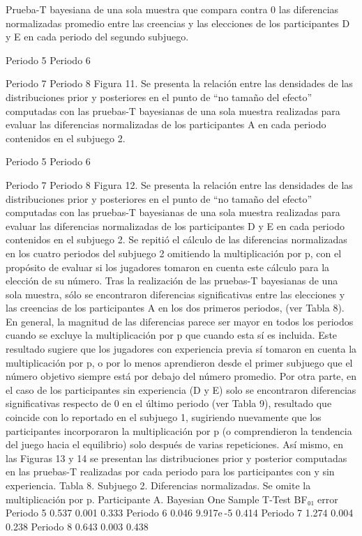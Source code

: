 Prueba-T bayesiana de una sola muestra que compara contra 0 las diferencias normalizadas promedio entre las creencias y las elecciones de los participantes D y E en cada periodo del segundo subjuego.

  
Periodo 5					Periodo 6
  
Periodo 7					Periodo 8
Figura 11. Se presenta la relación entre las densidades de las distribuciones prior y posteriores en el punto de “no tamaño del efecto” computadas con las pruebas-T bayesianas de una sola muestra realizadas para evaluar las diferencias normalizadas de los participantes A en cada periodo contenidos en el subjuego 2.

  
Periodo 5					Periodo 6
  
Periodo 7					Periodo 8
Figura 12. Se presenta la relación entre las densidades de las distribuciones prior y posteriores en el punto de “no tamaño del efecto” computadas con las pruebas-T bayesianas de una sola muestra realizadas para evaluar las diferencias normalizadas de los participantes D y E en cada periodo contenidos en el subjuego 2.
Se repitió el cálculo de las diferencias normalizadas en los cuatro periodos del subjuego 2 omitiendo la multiplicación por p, con el propósito de evaluar si los jugadores tomaron en cuenta este cálculo para la elección de su número. Tras la realización de las pruebas-T bayesianas de una sola muestra,  sólo se encontraron diferencias significativas entre las elecciones y las creencias de los participantes A en los dos primeros  periodos, (ver Tabla 8). En general, la magnitud de las diferencias parece ser mayor en todos los periodos cuando se excluye la multiplicación por p que cuando esta sí es incluida. Este resultado sugiere que los jugadores con experiencia previa sí tomaron en cuenta la multiplicación por p, o por lo menos aprendieron desde el primer subjuego que el número objetivo siempre está por debajo del número promedio.
Por otra parte, en el caso de los participantes sin experiencia (D y E) solo se encontraron diferencias significativas respecto de 0 en el último periodo (ver Tabla 9), resultado que coincide con lo reportado en el subjuego 1, sugiriendo nuevamente que los participantes incorporaron la multiplicación por p (o comprendieron la tendencia del juego hacia el equilibrio)  solo después de varias repeticiones. Así mismo, en las Figuras 13 y 14 se presentan las distribuciones prior y posterior computadas en las pruebas-T realizadas por cada periodo para los participantes con y sin experiencia.
Tabla 8. Subjuego 2. Diferencias normalizadas. Se omite la multiplicación por p. Participante A.
Bayesian One Sample T-Test	
	BF₀₁	error %
Periodo 5		0.537		0.001		0.333 
Periodo 6		0.046		9.917e -5		0.414 
Periodo 7		1.274		0.004		0.238 
Periodo 8		0.643		0.003		0.438 
	
